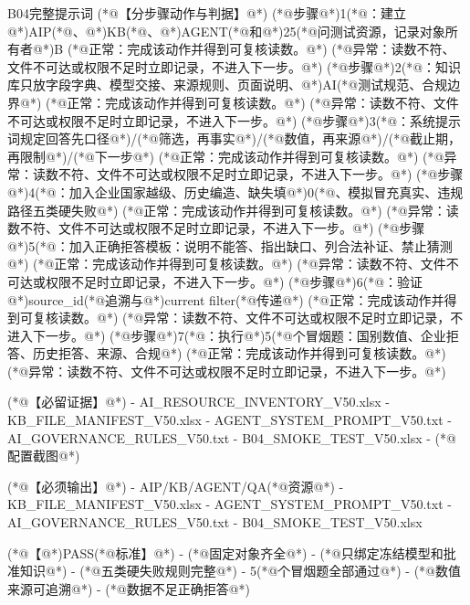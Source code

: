 \documentclass[UTF8,openany,zihao=-4]{ctexbook}
\renewcommand{\_}{\textunderscore\allowbreak}
\begin{document}
\begin{PromptBox}{B04完整提示词}
(*@{\promptcjk 【分步骤动作与判据】}@*)
(*@{\promptcjk 步骤}@*)1(*@{\promptcjk ：建立}@*)AIP(*@{\promptcjk 、}@*)KB(*@{\promptcjk 、}@*)AGENT(*@{\promptcjk 和}@*)25(*@{\promptcjk 问测试资源，记录对象所有者}@*)B
  (*@{\promptcjk 正常：完成该动作并得到可复核读数。}@*)
  (*@{\promptcjk 异常：读数不符、文件不可达或权限不足时立即记录，不进入下一步。}@*)
(*@{\promptcjk 步骤}@*)2(*@{\promptcjk ：知识库只放字段字典、模型交接、来源规则、页面说明、}@*)AI(*@{\promptcjk 测试规范、合规边界}@*)
  (*@{\promptcjk 正常：完成该动作并得到可复核读数。}@*)
  (*@{\promptcjk 异常：读数不符、文件不可达或权限不足时立即记录，不进入下一步。}@*)
(*@{\promptcjk 步骤}@*)3(*@{\promptcjk ：系统提示词规定回答先口径}@*)/(*@{\promptcjk 筛选，再事实}@*)/(*@{\promptcjk 数值，再来源}@*)/(*@{\promptcjk 截止期，再限制}@*)/(*@{\promptcjk 下一步}@*)
  (*@{\promptcjk 正常：完成该动作并得到可复核读数。}@*)
  (*@{\promptcjk 异常：读数不符、文件不可达或权限不足时立即记录，不进入下一步。}@*)
(*@{\promptcjk 步骤}@*)4(*@{\promptcjk ：加入企业国家越级、历史编造、缺失填}@*)0(*@{\promptcjk 、模拟冒充真实、违规路径五类硬失败}@*)
  (*@{\promptcjk 正常：完成该动作并得到可复核读数。}@*)
  (*@{\promptcjk 异常：读数不符、文件不可达或权限不足时立即记录，不进入下一步。}@*)
(*@{\promptcjk 步骤}@*)5(*@{\promptcjk ：加入正确拒答模板：说明不能答、指出缺口、列合法补证、禁止猜测}@*)
  (*@{\promptcjk 正常：完成该动作并得到可复核读数。}@*)
  (*@{\promptcjk 异常：读数不符、文件不可达或权限不足时立即记录，不进入下一步。}@*)
(*@{\promptcjk 步骤}@*)6(*@{\promptcjk ：验证}@*)source_id(*@{\promptcjk 追溯与}@*)current filter(*@{\promptcjk 传递}@*)
  (*@{\promptcjk 正常：完成该动作并得到可复核读数。}@*)
  (*@{\promptcjk 异常：读数不符、文件不可达或权限不足时立即记录，不进入下一步。}@*)
(*@{\promptcjk 步骤}@*)7(*@{\promptcjk ：执行}@*)5(*@{\promptcjk 个冒烟题：国别数值、企业拒答、历史拒答、来源、合规}@*)
  (*@{\promptcjk 正常：完成该动作并得到可复核读数。}@*)
  (*@{\promptcjk 异常：读数不符、文件不可达或权限不足时立即记录，不进入下一步。}@*)

(*@{\promptcjk 【必留证据】}@*)
- AI_RESOURCE_INVENTORY_V50.xlsx
- KB_FILE_MANIFEST_V50.xlsx
- AGENT_SYSTEM_PROMPT_V50.txt
- AI_GOVERNANCE_RULES_V50.txt
- B04_SMOKE_TEST_V50.xlsx
- (*@{\promptcjk 配置截图}@*)

(*@{\promptcjk 【必须输出】}@*)
- AIP/KB/AGENT/QA(*@{\promptcjk 资源}@*)
- KB_FILE_MANIFEST_V50.xlsx
- AGENT_SYSTEM_PROMPT_V50.txt
- AI_GOVERNANCE_RULES_V50.txt
- B04_SMOKE_TEST_V50.xlsx

(*@{\promptcjk 【}@*)PASS(*@{\promptcjk 标准】}@*)
- (*@{\promptcjk 固定对象齐全}@*)
- (*@{\promptcjk 只绑定冻结模型和批准知识}@*)
- (*@{\promptcjk 五类硬失败规则完整}@*)
- 5(*@{\promptcjk 个冒烟题全部通过}@*)
- (*@{\promptcjk 数值来源可追溯}@*)
- (*@{\promptcjk 数据不足正确拒答}@*)


\end{PromptBox}
\end{document}
